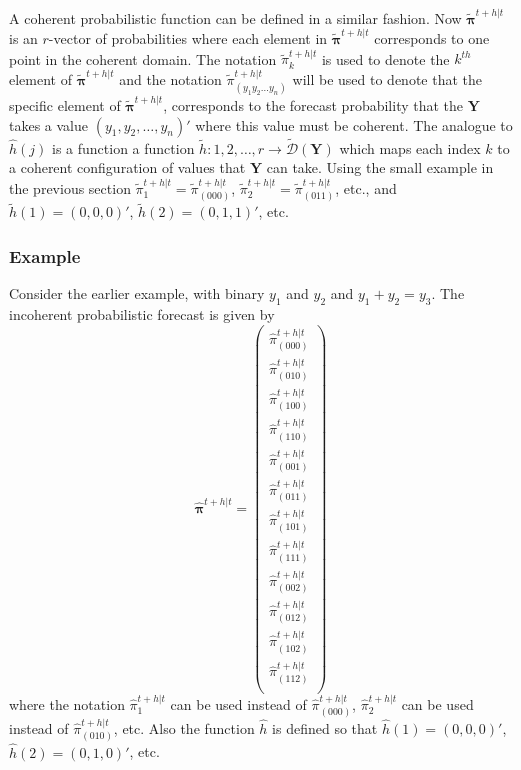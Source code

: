 \documentclass{article}
\newcommand{\bY}{\mathbf{Y}}
\newcommand{\bpi}{\bm{\pi}}
\begin{document}
    A coherent probabilistic function can be defined in a similar fashion. Now $\tilde{\bpi}^{t+h|t}$ is an $r$-vector of probabilities where each element in $\tilde{\bpi}^{t+h|t}$ corresponds to one point in the coherent domain. The notation $\tilde{\pi}_k^{t+h|t}$ is used to denote the $k^{th}$ element of $\tilde{\bpi}^{t+h|t}$ and the notation $\tilde{\pi}_{(y_1 y_2 \dots y_n)}^{t+h|t}$ will be used to denote that the specific element of $\tilde{\bpi}^{t+h|t}$, corresponds to the forecast probability that the $\bY$ takes a value $(y_1,y_2,\dots,y_n)'$ where this value must be coherent. The analogue to $\hat{h}(j)$ is a function a function $\tilde{h}:{1,2,\dots,r}\rightarrow\tilde{\mathcal{D}}(\bY)$ which maps each index $k$ to a coherent configuration of values that $\bY$ can take. Using the small example in the previous section $\tilde{\pi}_1^{t+h|t}=\tilde{\pi}_{(000)}^{t+h|t}$, $\tilde{\pi}_2^{t+h|t}=\tilde{\pi}_{(011)}^{t+h|t}$, etc., and $\tilde{h}(1)=(0,0,0)'$, $\tilde{h}(2)=(0,1,1)'$, etc.
    
    \subsubsection*{Example}
    
    Consider the earlier example, with binary $y_1$ and $y_2$ and $y_1+y_2=y_3$. The incoherent probabilistic forecast is given by
    \[
      \hat{\bpi}^{t+h|t}=\begin{pmatrix}
         \hat{\pi}^{t+h|t}_{(000)}\\
         \hat{\pi}^{t+h|t}_{(010)}\\
         \hat{\pi}^{t+h|t}_{(100)}\\
         \hat{\pi}^{t+h|t}_{(110)}\\
         \hat{\pi}^{t+h|t}_{(001)}\\
         \hat{\pi}^{t+h|t}_{(011)}\\
         \hat{\pi}^{t+h|t}_{(101)}\\
         \hat{\pi}^{t+h|t}_{(111)}\\
         \hat{\pi}^{t+h|t}_{(002)}\\
         \hat{\pi}^{t+h|t}_{(012)}\\
         \hat{\pi}^{t+h|t}_{(102)}\\
         \hat{\pi}^{t+h|t}_{(112)}\\
      \end{pmatrix}
    \]
    where the notation $\hat{\pi}^{t+h|t}_{1}$ can be used instead of $\hat{\pi}^{t+h|t}_{(000)}$, $\hat{\pi}^{t+h|t}_{2}$ can be used instead of $\hat{\pi}^{t+h|t}_{(010)}$, etc. Also the function $\hat{h}$ is defined so that $\hat{h}(1)=(0,0,0)'$, $\hat{h}(2)=(0,1,0)'$, etc.
    
\end{document}
